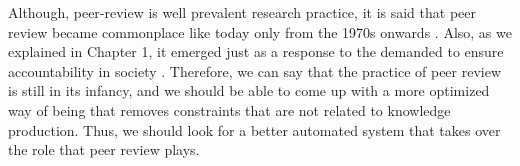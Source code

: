 \documentclass{book}
\begin{document}
Although, peer-review is well prevalent research practice, it is said that peer review became commonplace like today only from the 1970s onwards \cite{baldwin2018scientific}. Also, as we explained in Chapter 1, it emerged just as a response to the demanded to ensure accountability in society \cite{baldwin2018scientific}. Therefore, we can say that the practice of peer review is still in its infancy, and we should be able to come up with a more optimized way of being that removes constraints that are not related to knowledge production. Thus, we should look for a better automated system that takes over the role that peer review plays.




\end{document}
